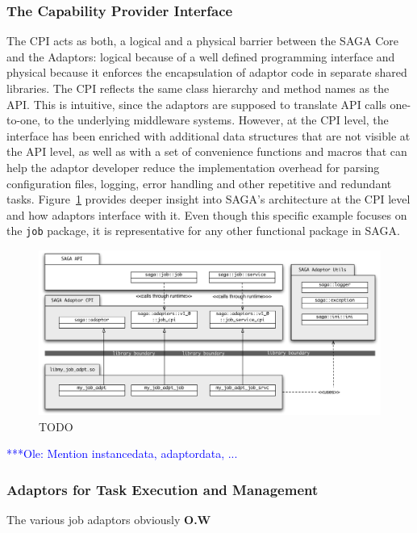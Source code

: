 \documentclass[a4paper,10pt]{article}
\newcommand{\onote}[1]{  {\textcolor{blue}     { ***Ole: #1 }}}
\newcommand{\onote}[1]{}
\begin{document}
 \subsubsection{The Capability Provider Interface}
 
 The CPI acts as both, a logical and a physical barrier between the
 SAGA Core and the Adaptors: logical because of a well defined
 programming interface and physical because it enforces the
 encapsulation of adaptor code in separate shared libraries. The CPI
 reflects the same class hierarchy and method names as the API. This
 is intuitive, since the adaptors are supposed to translate API calls
 one-to-one, to the underlying middleware systems.  However, at the
 CPI level, the interface has been enriched with additional data
 structures that are not visible at the API level, as well as with a
 set of convenience functions and macros that can help the adaptor
 developer reduce the implementation overhead for parsing
 configuration files, logging, error handling and other repetitive and
 redundant tasks.  Figure~\ref{fig:cpi-detail} provides deeper insight
 into SAGA's architecture at the CPI level and how adaptors interface
 with it. Even though this specific example focuses on the
 \texttt{job} package, it is representative for any other functional
 package in SAGA.
 
 \begin{figure}
 \begin{center}
 \includegraphics[scale=0.5]{figures/cpi-detail}
 \end{center}
 \caption{TODO}
\label{fig:cpi-detail}
\end{figure}

 
 \onote{Mention instancedata, adaptordata, ...}
 
 \subsubsection{Adaptors for Task Execution and Management}
 The various job adaptors obviously \textbf{O.W}
 
\end{document}
